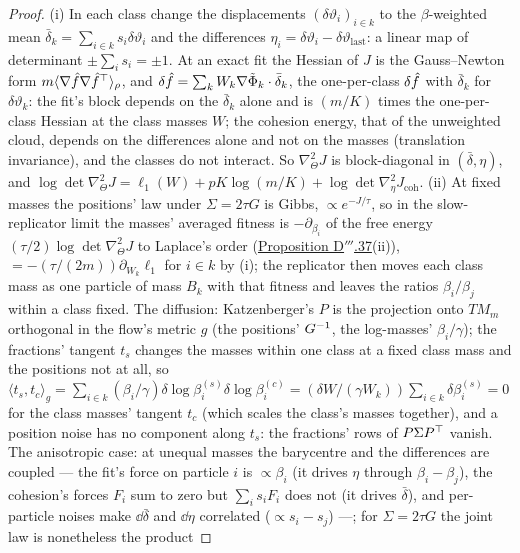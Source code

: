 \begin{proof}
(i) In each class change the displacements $(\delta\vartheta_i)_{i\in k}$ to the $\beta$-weighted mean
$\bar\delta_k = \sum_{i\in k}s_i\delta\vartheta_i$ and the differences
$\eta_i = \delta\vartheta_i - \delta\vartheta_{\mathrm{last}}$: a linear map of determinant $\pm\sum_is_i = \pm1$. At an
exact fit the Hessian of $J$ is the Gauss--Newton form $m\langle\nabla\hat f\nabla\hat f^\top\rangle_\rho$, and
$\delta\hat f = \sum_kW_k\nabla\tilde\Phi_k\cdot\bar\delta_k$, the one-per-class $\delta\hat f$ with $\bar\delta_k$ for
$\delta\vartheta_k$: the fit's block depends on the $\bar\delta_k$ alone and is $(m/K)$ times the one-per-class Hessian
at the class masses $W$; the cohesion energy, that of the unweighted cloud, depends on the differences alone and not on
the masses (translation invariance), and the classes do not interact. So $\nabla^2_\Theta J$ is block-diagonal in
$(\bar\delta,\eta)$, and
$\log\det\nabla^2_\Theta J = \ell_1(W) + pK\log(m/K) + \log\det\nabla^2_\eta J_{\mathrm{coh}}$. (ii) At fixed masses
the positions' law under $\Sigma = 2\tau G$ is Gibbs, $\propto e^{-J/\tau}$, so in the slow-replicator limit the masses'
averaged fitness is $-\partial_{\beta_i}$ of the free energy $(\tau/2)\log\det\nabla^2_\Theta J$ to Laplace's order
(\hyperref[res:thmDppp:37]{Proposition D$'''$.37}(ii)), $= -(\tau/(2m))\partial_{W_k}\ell_1$ for $i\in k$ by (i); the
replicator then moves each class mass as one particle of mass $B_k$ with that fitness and leaves the ratios
$\beta_i/\beta_j$ within a class fixed. The diffusion: Katzenberger's $P$ is the projection onto $TM_m$ orthogonal in the
flow's metric $g$ (the positions' $G^{-1}$, the log-masses' $\beta_i/\gamma$); the fractions' tangent $t_s$ changes the
masses within one class at a fixed class mass and the positions not at all, so
$\langle t_s,t_c\rangle_g = \sum_{i\in k}(\beta_i/\gamma)\delta\log\beta_i^{(s)}\delta\log\beta_i^{(c)}
= (\delta W/(\gamma W_k))\sum_{i\in k}\delta\beta_i^{(s)} = 0$ for the class masses' tangent $t_c$ (which scales the
class's masses together), and a position noise has no component along $t_s$: the fractions' rows of $P\Sigma P^\top$
vanish. The anisotropic case: at unequal masses the barycentre and the differences are coupled --- the fit's force on
particle $i$ is $\propto\beta_i$ (it drives $\eta$ through $\beta_i - \beta_j$), the cohesion's forces $F_i$ sum to zero
but $\sum_is_iF_i$ does not (it drives $\bar\delta$), and per-particle noises make $\dd\bar\delta$ and $\dd\eta$
correlated ($\propto s_i - s_j$) ---; for $\Sigma = 2\tau G$ the joint law is nonetheless the product

\end{proof}
